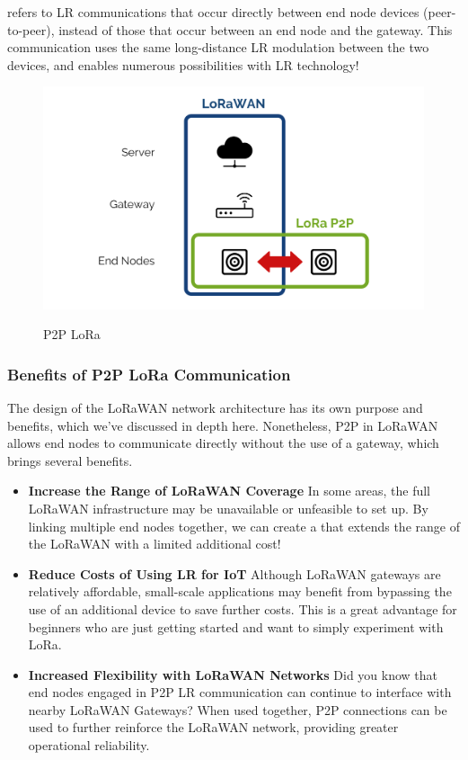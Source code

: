  refers to LR communications that occur directly between end node devices (peer-to-peer), instead of those that occur between an end node and the gateway. This communication uses the same long-distance LR modulation between the two devices, and enables numerous possibilities with LR technology! \cite{SeeedP2PLoRa2021}

\begin{figure}
	\begin{center}
		\includegraphics[width=0.7\linewidth]{Images/LORA/P2P LoRa.png}
		\caption{P2P LoRa}
		\label{P2P LoRa} \cite{SeeedP2PLoRa2021}
	\end{center}
\end{figure}

\subsubsection{Benefits of P2P LoRa Communication}

The design of the LoRaWAN network architecture has its own purpose and benefits, which we’ve discussed in depth here. Nonetheless, P2P in LoRaWAN allows end nodes to communicate directly without the use of a gateway, which brings several benefits. \cite{SeeedP2PLoRa2021}

\begin{itemize}
	\item \textbf{Increase the Range of LoRaWAN Coverage} 
	In some areas, the full LoRaWAN infrastructure may be unavailable or unfeasible to set up. By linking multiple end nodes together, we can create a  that extends the range of the LoRaWAN with a limited additional cost!
	\item \textbf{Reduce Costs of Using LR for IoT}
	Although LoRaWAN gateways are relatively affordable, small-scale applications may benefit from bypassing the use of an additional device to save further costs. This is a great advantage for beginners who are just getting started and want to simply experiment with LoRa.
	\item \textbf{Increased Flexibility with LoRaWAN Networks}
	Did you know that end nodes engaged in P2P LR communication can continue to interface with nearby LoRaWAN Gateways? When used together, P2P connections can be used to further reinforce the LoRaWAN network, providing greater operational reliability. \cite{SeeedP2PLoRa2021}
\end{itemize}

